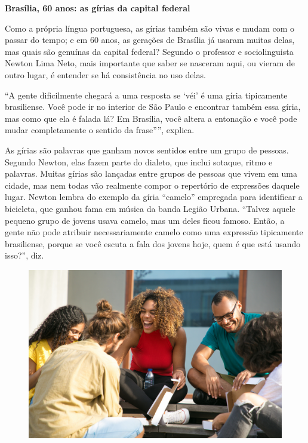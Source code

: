 \begin{myquote}

\textbf{Brasília, 60 anos: as gírias da capital federal}

Como a própria língua portuguesa, as gírias também são vivas e mudam com o
passar do tempo; e em 60 anos, as gerações de Brasília já usaram muitas delas,
mas quais são genuínas da capital federal? Segundo o professor e
sociolinguista Newton Lima Neto, mais importante que saber se nasceram aqui,
ou vieram de outro lugar, é entender se há consistência no uso delas.

``A gente dificilmente chegará a uma resposta se `véi' é uma gíria tipicamente
brasiliense. Você pode ir no interior de São Paulo e encontrar também essa
gíria, mas como que ela é falada lá? Em Brasília, você altera a entonação e
você pode mudar completamente o sentido da frase''”, explica.

As gírias são palavras que ganham novos sentidos entre um grupo de pessoas.
Segundo Newton, elas fazem parte do dialeto, que inclui sotaque, ritmo e
palavras. Muitas gírias são lançadas entre grupos de pessoas que vivem em uma cidade,
mas nem todas vão realmente compor o repertório de expressões daquele lugar.
Newton lembra do exemplo da gíria ``camelo'' empregada para identificar a
bicicleta, que ganhou fama em música da banda Legião Urbana. ``Talvez aquele
pequeno grupo de jovens usava camelo, mas um deles ficou famoso. Então, a
gente não pode atribuir necessariamente camelo como uma expressão tipicamente
brasiliense, porque se você escuta a fala dos jovens hoje, quem é que está
usando isso?'', diz.


\begin{figure}[H]
\centering
\includegraphics[width=\textwidth]{./imgSAEB_7_POR/media/image58.png}
\end{figure}
\end{myquote}

